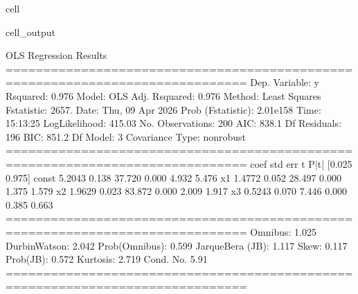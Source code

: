 \documentclass[letterpaper,10pt,english]{jupyterBook}
\begin{document}
\begin{sphinxuseclass}{cell}
\begin{sphinxVerbatimOutput}
\begin{sphinxuseclass}{cell_output}
\begin{sphinxVerbatim}[commandchars=\\\{\}]
                            OLS Regression Results                            
==============================================================================
Dep. Variable:                      y   R\PYGZhy{}squared:                       0.976
Model:                            OLS   Adj. R\PYGZhy{}squared:                  0.976
Method:                 Least Squares   F\PYGZhy{}statistic:                     2657.
Date:                Thu, 09 Apr 2026   Prob (F\PYGZhy{}statistic):          2.01e\PYGZhy{}158
Time:                        15:13:25   Log\PYGZhy{}Likelihood:                \PYGZhy{}415.03
No. Observations:                 200   AIC:                             838.1
Df Residuals:                     196   BIC:                             851.2
Df Model:                           3                                         
Covariance Type:            nonrobust                                         
==============================================================================
                 coef    std err          t      P\PYGZgt{}|t|      [0.025      0.975]
\PYGZhy{}\PYGZhy{}\PYGZhy{}\PYGZhy{}\PYGZhy{}\PYGZhy{}\PYGZhy{}\PYGZhy{}\PYGZhy{}\PYGZhy{}\PYGZhy{}\PYGZhy{}\PYGZhy{}\PYGZhy{}\PYGZhy{}\PYGZhy{}\PYGZhy{}\PYGZhy{}\PYGZhy{}\PYGZhy{}\PYGZhy{}\PYGZhy{}\PYGZhy{}\PYGZhy{}\PYGZhy{}\PYGZhy{}\PYGZhy{}\PYGZhy{}\PYGZhy{}\PYGZhy{}\PYGZhy{}\PYGZhy{}\PYGZhy{}\PYGZhy{}\PYGZhy{}\PYGZhy{}\PYGZhy{}\PYGZhy{}\PYGZhy{}\PYGZhy{}\PYGZhy{}\PYGZhy{}\PYGZhy{}\PYGZhy{}\PYGZhy{}\PYGZhy{}\PYGZhy{}\PYGZhy{}\PYGZhy{}\PYGZhy{}\PYGZhy{}\PYGZhy{}\PYGZhy{}\PYGZhy{}\PYGZhy{}\PYGZhy{}\PYGZhy{}\PYGZhy{}\PYGZhy{}\PYGZhy{}\PYGZhy{}\PYGZhy{}\PYGZhy{}\PYGZhy{}\PYGZhy{}\PYGZhy{}\PYGZhy{}\PYGZhy{}\PYGZhy{}\PYGZhy{}\PYGZhy{}\PYGZhy{}\PYGZhy{}\PYGZhy{}\PYGZhy{}\PYGZhy{}\PYGZhy{}\PYGZhy{}
const          5.2043      0.138     37.720      0.000       4.932       5.476
x1             1.4772      0.052     28.497      0.000       1.375       1.579
x2            \PYGZhy{}1.9629      0.023    \PYGZhy{}83.872      0.000      \PYGZhy{}2.009      \PYGZhy{}1.917
x3             0.5243      0.070      7.446      0.000       0.385       0.663
==============================================================================
Omnibus:                        1.025   Durbin\PYGZhy{}Watson:                   2.042
Prob(Omnibus):                  0.599   Jarque\PYGZhy{}Bera (JB):                1.117
Skew:                          \PYGZhy{}0.117   Prob(JB):                        0.572
Kurtosis:                       2.719   Cond. No.                         5.91
==============================================================================


\end{sphinxVerbatim}
\end{sphinxuseclass}
\end{sphinxVerbatimOutput}
\end{sphinxuseclass}
\end{document}
